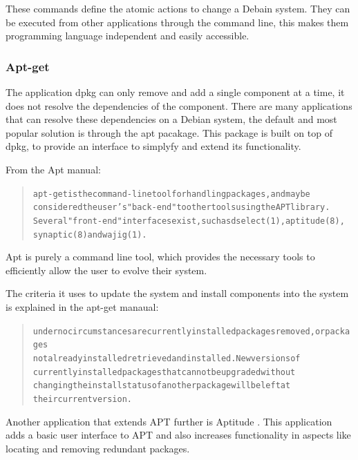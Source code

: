 These commands define the atomic actions to change a Debain system.
They can be executed from other applications through the command line, this makes them programming language independent and easily accessible. 

\subsubsection{Apt-get}
The application dpkg can only remove and add a single component at a time, it does not resolve the dependencies of the component.
There are many applications that can resolve these dependencies on a Debian system, the default and most popular solution is through the apt pacakage.
This package is built on top of dpkg, to provide an interface to simplyfy and extend its functionality.

From the Apt manual:
\begin{quotation}
\begin{alltt}
apt-get is the command-line tool for handling packages, and may be
       considered the user's "back-end" to other tools using the APT library.
       Several "front-end" interfaces exist, such as dselect(1), aptitude(8),
       synaptic(8) and wajig(1).
 \end{alltt}
\end{quotation}

Apt is purely a command line tool, which provides the necessary tools to efficiently allow the user to evolve their system.

The criteria it uses to update the system and install components into the system is explained in the apt-get manaual:

\begin{quotation}
\begin{alltt}
       under no circumstances are currently installed packages removed, or packages
       not already installed retrieved and installed. New versions of
       currently installed packages that cannot be upgraded without
       changing the install status of another package will be left at
       their current version.
 \end{alltt}
\end{quotation}

Another application that extends APT further is Aptitude \cite{Burrows2005}.
This application adds a basic user interface to APT and also increases functionality in aspects like locating and removing redundant packages. 


